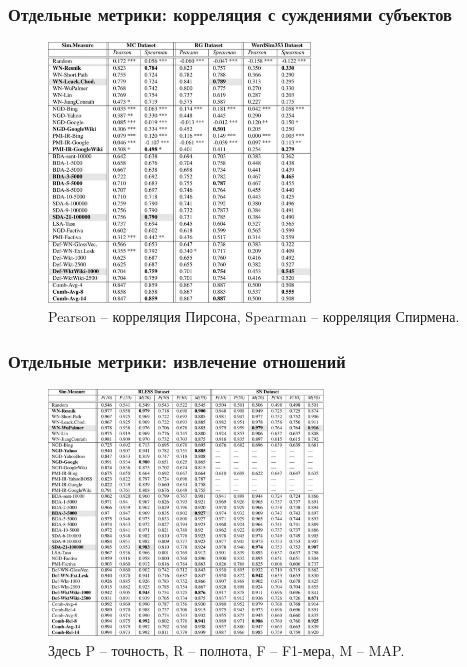 \documentclass{beamer}
\begin{document}
\begin{frame}
\frametitle{Отдельные метрики: корреляция с суждениями субъектов}

	\begin{figure}
	\centering
		\includegraphics[width=0.62\textwidth]{figures/hj}
		\caption{\footnotesize Pearson -- корреляция Пирсона, Spearman -- корреляция Спирмена.}
		
\end{figure}
	
\end{frame}

\begin{frame}
\frametitle{Отдельные метрики: извлечение отношений}

	\begin{figure}
	\centering
		\includegraphics[width=0.65\textwidth]{figures/sr}
		\caption{Здесь P -- точность, R -- полнота, F -- F1-мера, M -- MAP.}
		
\end{figure}
	
\end{frame}
\end{document}
